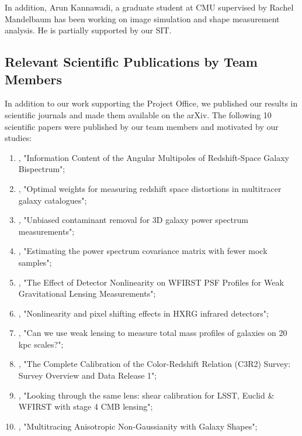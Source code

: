 In addition, Arun Kannawadi, a graduate student at CMU supervised by Rachel Mandelbaum has been working on image simulation and shape measurement analysis. He is partially supported by our SIT.

\subsection{Relevant Scientific Publications by Team Members}

In addition to our work supporting the Project Office, we published our results in scientific journals and made them available on the arXiv. The following 10 scientific papers were published by our team members and motivated by our studies:

\begin{enumerate}
\item \citet{2017MNRAS.467..928G}, "Information Content of the Angular Multipoles of Redshift-Space Galaxy Bispectrum";
\item \citet{2016MNRAS.463.2708P}, "Optimal weights for measuring redshift space distortions in multitracer galaxy catalogues";
\item \citet{2016MNRAS.463..467K}, "Unbiased contaminant removal for 3D galaxy power spectrum measurements";
\item \citet{2016MNRAS.457..993P}, "Estimating the power spectrum covariance matrix with fewer mock samples";
\item \citet{2016PASP..128j4001P}, "The Effect of Detector Nonlinearity on WFIRST PSF Profiles for Weak Gravitational Lensing Measurements";
\item \citet{2017JInst..12C4009P}, "Nonlinearity and pixel shifting effects in HXRG infrared detectors";
\item \citet{2015MNRAS.449.2128K}, "Can we use weak lensing to measure total mass profiles of galaxies on 20 kpc scales?";
\item \citet{2017arXiv170406665M}, "The Complete Calibration of the Color-Redshift Relation (C3R2) Survey: Survey Overview and Data Release 1";
\item \citet{Schaan:2016ois}, "Looking through the same lens: shear calibration for LSST, Euclid \& WFIRST with stage 4 CMB lensing";
\item \citet{Chisari:2016xki}, "Multitracing Anisotropic Non-Gaussianity with Galaxy Shapes";
\end{enumerate}

